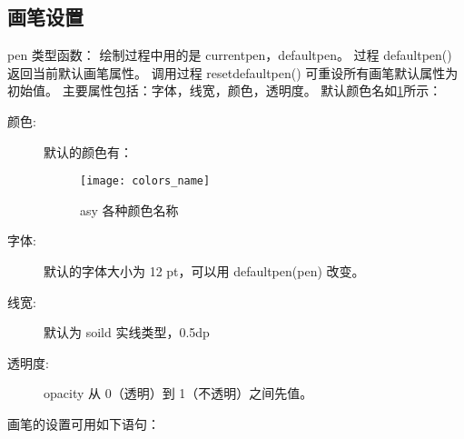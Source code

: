 \subsection{画笔设置}
pen 类型函数：
绘制过程中用的是 currentpen，defaultpen。
过程 defaultpen() 返回当前默认画笔属性。
调用过程 resetdefaultpen() 可重设所有画笔默认属性为初始值。
主要属性包括：字体，线宽，颜色，透明度。
默认颜色名如\ref{colors_name}所示：\\
\begin{description}
  \item[颜色:] 默认的颜色有：\\
\begin{figure}[htbp]
\centering
\texttt{[image: colors\_name]}\\
\caption{asy 各种颜色名称} \label{colors_name}
\end{figure}
  \item[字体:] 默认的字体大小为 12 pt，可以用 defaultpen(pen) 改变。\\
  \item[线宽:] 默认为 soild 实线类型，0.5dp
  \item[透明度:] opacity 从 0（透明）到 1（不透明）之间先值。
\end{description}
画笔的设置可用如下语句：\\
\clearpage

